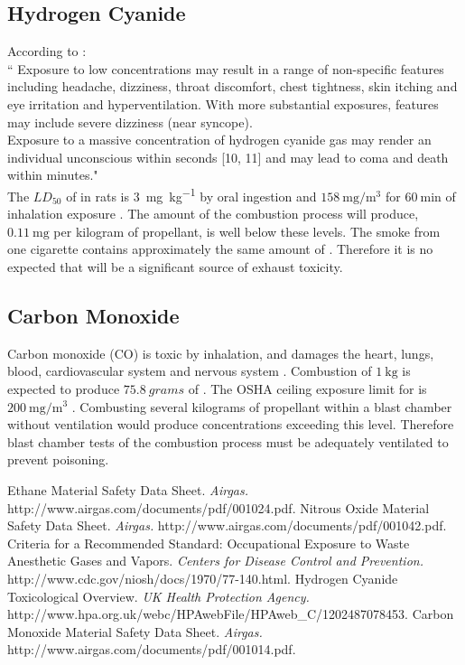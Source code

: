 \documentclass{article}
\begin{document}
\subsection{Hydrogen Cyanide}
According to \cite{HCNtox}:\\
`` Exposure to low concentrations may result in a range of non-specific features including
headache, dizziness, throat discomfort, chest tightness, skin itching and eye irritation and 
hyperventilation. With more substantial exposures, features may include severe 
dizziness (near syncope).\\
Exposure to a massive concentration of hydrogen cyanide gas may render an individual 
unconscious within seconds [10, 11] and may lead to coma and death within minutes."\\
The $LD_{50}$  of  in rats is \SI{3}{\milli\gram\per\kg} by oral ingestion and 
$\SI{158}{\milli\gram\per\cubic\metre}$ for $\SI{60}{\minute}$ of inhalation exposure \cite{HCNtox}.
The amount of  the combustion process will produce, $\SI{0.11}{\milli\gram}$ per kilogram of propellant,
is well below these levels. The smoke from one cigarette contains approximately the same amount of  \cite{HCNtox}.
Therefore it is no expected that  will be a significant source of exhaust toxicity.\\
\subsection{Carbon Monoxide}
Carbon monoxide (CO) is toxic by inhalation, and damages the heart, lungs, blood, cardiovascular system and nervous system \cite{COtox}.
Combustion of $\SI{1}{\kg}$ is expected to produce $\SI{75.8}{grams}$ of . 
The OSHA ceiling exposure limit for  is $\SI{200}{\milli\gram\per\cubic\metre}$ \cite{COtox}. 
Combusting several kilograms of propellant within a blast chamber without ventilation would produce concentrations exceeding this level. 
Therefore blast chamber tests of the combustion process must be adequately ventilated to prevent  poisoning.

\begin{thebibliography}{9}
	 Ethane Material Safety Data Sheet. \emph{Airgas.} http://www.airgas.com/documents/pdf/001024.pdf.
	 Nitrous Oxide Material Safety Data Sheet. \emph{Airgas.} http://www.airgas.com/documents/pdf/001042.pdf.
	 Criteria for a Recommended Standard: Occupational Exposure to Waste Anesthetic Gases and Vapors. \emph{Centers for Disease Control and Prevention.} http://www.cdc.gov/niosh/docs/1970/77-140.html.
	 Hydrogen Cyanide Toxicological Overview. \emph{UK Health Protection Agency.} http://www.hpa.org.uk/webc/HPAwebFile/HPAweb\_C/1202487078453.
	 Carbon Monoxide Material Safety Data Sheet. \emph{Airgas.} http://www.airgas.com/documents/pdf/001014.pdf.
\end{thebibliography}
\end{document}
